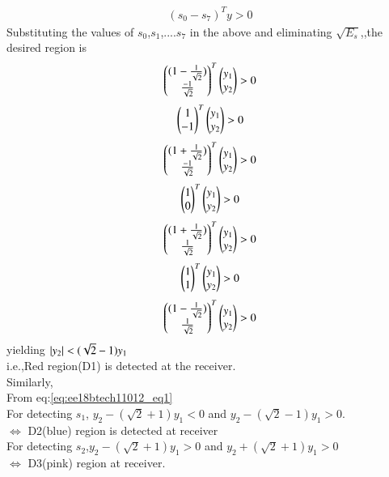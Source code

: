 \begin{enumerate}[label=\thesubsection.\arabic*.,ref=\thesubsection.\theenumi]
\begin{align}
    (s_{0}-s_{7})^Ty>0
\end{align}
Substituting the values of $s_{0}$,$s_{1}$,....$s_{7}$ in the above and eliminating $\sqrt{E_{s}}$,,the desired region is
\begin{align}
    \begin{pmatrix}(1-\frac{1}{\sqrt{2}})\\\frac{-1}{\sqrt{2}}\end{pmatrix}^T\begin{pmatrix}y_{1}\\y_{2}\end{pmatrix} > 0
\end{align}
\begin{align}
    \begin{pmatrix}1\\-1\end{pmatrix}^T\begin{pmatrix}y_{1}\\y_{2}\end{pmatrix} > 0
\end{align}
\begin{align}
    \begin{pmatrix}(1+\frac{1}{\sqrt{2}})\\\frac{-1}{\sqrt{2}}\end{pmatrix}^T\begin{pmatrix}y_{1}\\y_{2}\end{pmatrix} > 0
\end{align}
\begin{align}
    \begin{pmatrix}1\\0\end{pmatrix}^T\begin{pmatrix}y_{1}\\y_{2}\end{pmatrix} > 0
\end{align}
\begin{align}
    \begin{pmatrix}(1+\frac{1}{\sqrt{2}})\\\frac{1}{\sqrt{2}}\end{pmatrix}^T\begin{pmatrix}y_{1}\\y_{2}\end{pmatrix} > 0
\end{align}
\begin{align}
    \begin{pmatrix}1\\1\end{pmatrix}^T\begin{pmatrix}y_{1}\\y_{2}\end{pmatrix} > 0
\end{align}
\begin{align}
    \begin{pmatrix}(1-\frac{1}{\sqrt{2}})\\\frac{1}{\sqrt{2}}\end{pmatrix}^T\begin{pmatrix}y_{1}\\y_{2}\end{pmatrix} > 0
\end{align}
yielding $\left\vert y_{2}\right\vert < (\sqrt{2}-1)y_{1}$ \\i.e.,Red region(D1) is detected at the receiver.
\\
Similarly,\\
From eq:\ref{eq:ee18btech11012_eq1}\\
For detecting $s_1$, $y_2-(\sqrt{2}+1)y_1<0$ and $y_2-(\sqrt{2}-1)y_1>0$.\\
$\Longleftrightarrow$ D2(blue) region is detected at receiver
\\
For detecting $s_2$,$y_2-(\sqrt{2}+1)y_1 >0$ and $y_2+(\sqrt{2}+1)y_1>0$\\$\Longleftrightarrow$ D3(pink) region at receiver. 

\end{enumerate}
